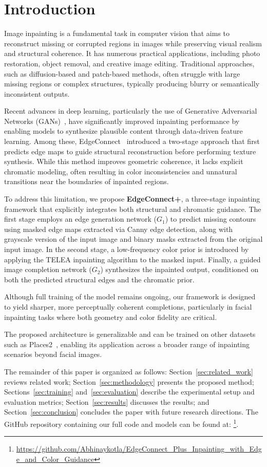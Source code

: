 \section{Introduction}

Image inpainting is a fundamental task in computer vision that aims to reconstruct missing or corrupted regions in images while preserving visual realism and structural coherence. It has numerous practical applications, including photo restoration, object removal, and creative image editing. Traditional approaches, such as diffusion-based and patch-based methods, often struggle with large missing regions or complex structures, typically producing blurry or semantically inconsistent outputs.

Recent advances in deep learning, particularly the use of Generative Adversarial Networks (GANs)~\cite{goodfellow2014generative}, have significantly improved inpainting performance by enabling models to synthesize plausible content through data-driven feature learning. Among these, EdgeConnect~\cite{nazeri2019edgeconnect} introduced a two-stage approach that first predicts edge maps to guide structural reconstruction before performing texture synthesis. While this method improves geometric coherence, it lacks explicit chromatic modeling, often resulting in color inconsistencies and unnatural transitions near the boundaries of inpainted regions.

To address this limitation, we propose \textbf{EdgeConnect+}, a three-stage inpainting framework that explicitly integrates both structural and chromatic guidance. The first stage employs an edge generation network (\(G_1\)) to predict missing contours using masked edge maps extracted via Canny edge detection, along with grayscale version of the input image and binary masks extracted from the original input image. In the second stage, a low-frequency color prior is introduced by applying the TELEA inpainting algorithm to the masked input. Finally, a guided image completion network (\(G_2\)) synthesizes the inpainted output, conditioned on both the predicted structural edges and the chromatic prior.

Although full training of the model remains ongoing, our framework is designed to yield sharper, more perceptually coherent completions, particularly in facial inpainting tasks where both geometry and color fidelity are critical.

The proposed architecture is generalizable and can be trained on other datasets such as Places2~\cite{places2}, enabling its application across a broader range of inpainting scenarios beyond facial images.

The remainder of this paper is organized as follows: Section~\ref{sec:related_work} reviews related work; Section~\ref{sec:methodology} presents the proposed method; Sections~\ref{sec:training} and~\ref{sec:evaluation} describe the experimental setup and evaluation metrics; Section~\ref{sec:results} discusses the results; and Section~\ref{sec:conclusion} concludes the paper with future research directions. The GitHub repository containing our full code and models can be found at: \footnote{\url{https://github.com/Abhinaykotla/EdgeConnect_Plus_Inpainting_with_Edge_and_Color_Guidance}}.

